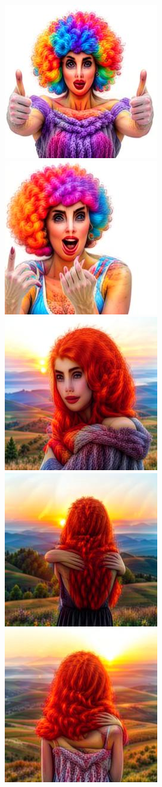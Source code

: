 \begin{figure}[h!]
\begin{subfigure}[t]{0.32\linewidth}
    	\includegraphics[width=0.32\linewidth]{figs/samples_appendix_4/draft1k_cfg_2_ode_prompt_21_image_1.jpg}\;%
    	\includegraphics[width=0.32\linewidth]{figs/samples_appendix_4/draft1k_cfg_2_ode_prompt_21_image_2.jpg}\\ 
    	\includegraphics[width=0.32\linewidth]{figs/samples_appendix_4/draft1k_cfg_2_ode_prompt_33_image_0.jpg}\;%
    	\includegraphics[width=0.32\linewidth]{figs/samples_appendix_4/draft1k_cfg_2_ode_prompt_33_image_1.jpg}\;%
    	\includegraphics[width=0.32\linewidth]{figs/samples_appendix_4/draft1k_cfg_2_ode_prompt_33_image_2.jpg}\\ 

\end{subfigure}
\end{figure}
